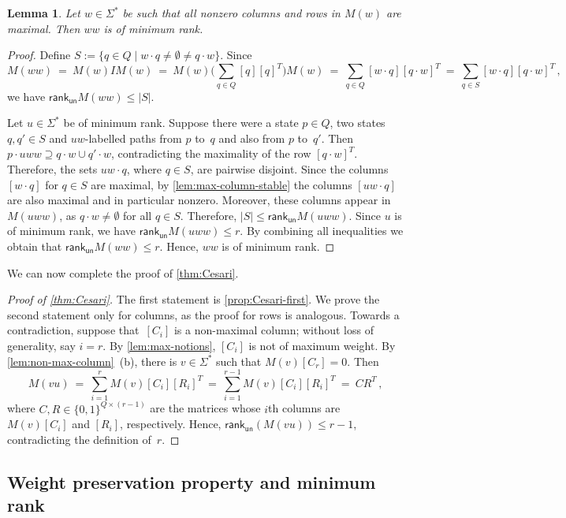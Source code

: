 \documentclass[11pt,a4paper]{amsart}
\newcommand{\rku}{\mathsf{rank}_{\mathsf{un}}}
\theoremstyle{plain}
\newtheorem{lem}[thm]{Lemma}
\theoremstyle{definition}
\theoremstyle{defC}
\theoremstyle{thmC}
\theoremstyle{plain}
\numberwithin{equation}{section}
\begin{document}
\begin{lem} \label{lem:all-max-column}
Let $w \in \Sigma^*$ be such that all nonzero columns and rows in $M(w)$ are maximal. Then %
$w w$ is of minimum rank.
\end{lem}
\begin{proof}
Define $S := \{q \in Q \mid w \cdot q \ne \emptyset \ne q \cdot w\}$.
Since
\[
M(w w) \ = \ M(w) I M(w) \ = \ M(w) \big( \sum_{q \in Q} [q] [q]^T \big) M(w) \ = \ \sum_{q \in Q} [w \cdot q] [q \cdot w]^T \ = \ \sum_{q \in S} [w \cdot q] [q \cdot w]^T\,,
\]
we have $\rku M(w w) \le |S|$. %

\noindent
Let $u \in \Sigma^*$ be of minimum rank.
Suppose there were a state $p \in Q$, two states $q, q' \in S$ and $u w$-labelled paths from $p$ to~$q$ and also from $p$ to~$q'$.
Then $p \cdot u w w \supseteq q \cdot w \cup q' \cdot w$, contradicting the maximality of the row $[q \cdot w]^T$.
Therefore, the sets $u w \cdot q$, where $q \in S$, are pairwise disjoint.
Since the columns $[w \cdot q]$ for $q \in S$ are maximal, by \autoref{lem:max-column-stable} the columns $[u w \cdot q]$ are also maximal and in particular nonzero.
Moreover, these columns appear in $M(u w w)$, as $q \cdot w \ne \emptyset$ for all $q \in S$.
Therefore, $|S| \le \rku M(u w w)$.
Since $u$ is of minimum rank, we have $\rku M(u w w) \le r$.
By combining all inequalities we obtain that $\rku M(w w) \le r$.
Hence, $w w$ is of minimum rank.
\end{proof}

\noindent
We can now complete the proof of \autoref{thm:Cesari}.
\begin{proof}[Proof of \autoref{thm:Cesari}]
The first statement is \autoref{prop:Cesari-first}.
We prove the second statement only for columns, as the proof for rows is analogous.
Towards a contradiction, suppose that~$[C_i]$ is a non-maximal column; without loss of generality, say $i=r$.
By \autoref{lem:max-notions}, $[C_i]$ is not of maximum weight.
By \autoref{lem:non-max-column}~(b), there is $v \in \Sigma^*$ such that $M(v) [C_r] = 0$.
Then 
\[
 M(v u) \ = \ \sum_{i=1}^r M(v) [C_i] [R_i]^T \ = \ \sum_{i=1}^{r-1} M(v) [C_i] [R_i]^T \ = \ C R^T\,,
\]
where 
$C, R \in \{0,1\}^{Q \times (r-1)}$ are the matrices whose $i$th columns are $M(v) [C_i]$ and $[R_i]$, respectively.
Hence, $\rku(M(v u)) \le r-1$, contradicting the definition of~$r$.
\end{proof}


\subsection{Weight preservation property and minimum rank}\label{subsec:weight-preserv}
\end{document}
